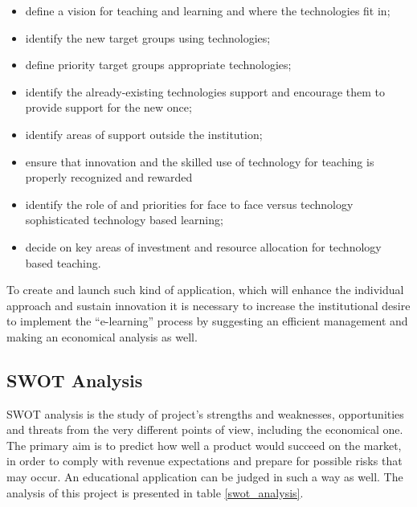 \begin{itemize}
  \setlength{\itemsep}{2pt}
  \setlength{\parskip}{1pt}  
  \item define a vision for teaching and learning and where the technologies fit in;
  \item identify the new target groups using technologies;
  \item define priority target groups appropriate technologies;
  \item identify the already-existing technologies support and encourage them to provide support for the new once;
  \item identify areas of support outside the institution;
  \item ensure that innovation and the skilled use of technology for teaching is properly recognized and rewarded
  \item identify the role of and priorities for face to face versus technology sophisticated technology     based learning;
  \item decide on key areas of investment and resource allocation for technology based teaching.
\end{itemize}

To create and launch such kind of application, which will enhance the individual approach and sustain innovation it is necessary to increase the institutional desire to implement the “e-learning” process by suggesting an efficient management and making an economical analysis as well.

\subsection{SWOT Analysis}
SWOT analysis is the study of project’s strengths and weaknesses, opportunities and threats from the very different points of view, including the economical one. The primary aim is to predict how well a product would succeed on the market, in order to comply with revenue expectations and prepare for possible risks that may occur. An educational application can be judged in such a way as well. The analysis of this project is presented in table \ref{swot_analysis}.


